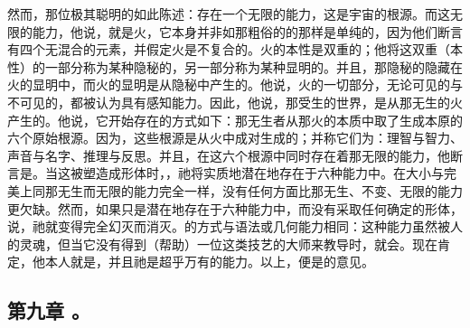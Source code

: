 然而，那位极其聪明的如此陈述：存在一个无限的能力，这是宇宙的根源。而这无限的能力，他说，就是火，它本身并非如那粗俗的的那样是单纯的，因为他们断言有四个无混合的元素，并假定火是不复合的。火的本性是双重的；他将这双重（本性）的一部分称为某种隐秘的，另一部分称为某种显明的。并且，那隐秘的隐藏在火的显明中，而火的显明是从隐秘中产生的。他说，火的一切部分，无论可见的与不可见的，都被认为具有感知能力。因此，他说，那受生的世界，是从那无生的火产生的。他说，它开始存在的方式如下：那无生者从那火的本质中取了生成本原的六个原始根源。因为，这些根源是从火中成对生成的；并称它们为：理智与智力、声音与名字、推理与反思。并且，在这六个根源中同时存在着那无限的能力，他断言是。当这被塑造成形体时，，祂将实质地潜在地存在于六种能力中。在大小与完美上同那无生而无限的能力完全一样，没有任何方面比那无生、不变、无限的能力更欠缺。然而，如果只是潜在地存在于六种能力中，而没有采取任何确定的形体，说，祂就变得完全幻灭而消灭。的方式与语法或几何能力相同：这种能力虽然被人的灵魂，但当它没有得到（帮助）一位这类技艺的大师来教导时，就会。现在肯定，他本人就是，并且祂是超乎万有的能力。以上，便是的意见。\par


\subsection{第九章 。}

